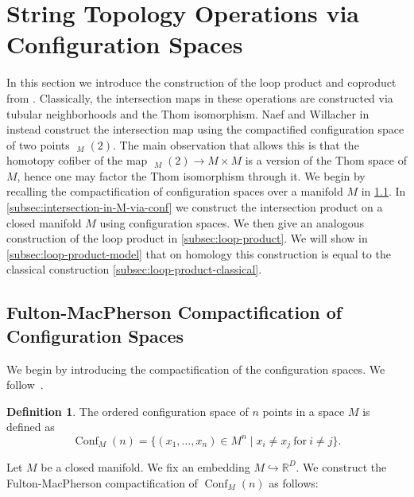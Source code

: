 \documentclass{scrartcl}
\theoremstyle{plain}
\theoremstyle{definition}
\newtheorem{definition}[theorem]{Definition}
\newcommand{\R}{\mathbb R}
\DeclareMathOperator{\Conf}{Conf}
\DeclareMathOperator{\cConf}{\overline{Conf}}
\begin{document}
\section{String Topology Operations via Configuration Spaces}\label{sec:string-ops-via-cfg-spaces}

In this section we introduce the construction of the loop product and coproduct from \cite{naef2019string}. Classically, the intersection maps in these operations are constructed via tubular neighborhoods and the Thom isomorphism. Naef and Willacher in \cite{naef2019string} instead construct the intersection map using the compactified configuration space of two points $\cConf_M(2)$. The main observation that allows this is that the homotopy cofiber of the map $\cConf_M(2)\to M\times M$ is a version of the Thom space of $M$, hence one may factor the Thom isomorphism through it. We begin by recalling the compactification of configuration spaces over a manifold $M$ in \cref{subsec:compactificatified-configuration-space}. In \cref{subsec:intersection-in-M-via-conf} we construct the intersection product on a closed manifold $M$ using configuration spaces. We then give an analogous construction of the loop product in \cref{subsec:loop-product}. We will show in \cref{subsec:loop-product-model} that on homology this construction is equal to the classical construction \ref{subsec:loop-product-classical}. 

\subsection{Fulton-MacPherson Compactification of Configuration Spaces}\label{subsec:compactificatified-configuration-space}

We begin by introducing the compactification of the configuration spaces. We follow~\cite{sinha2004manifold}.

\begin{definition}
The ordered configuration space of $n$ points in a space $M$ is defined as $$\Conf_M(n) = \{(x_1, \dots, x_n)\in M^n\mid x_i\neq x_j\ \text{for}\ i\neq j\}.$$ 
\end{definition}

Let $M$ be a closed manifold. We fix an embedding $M \hookrightarrow \R^D$. We construct the Fulton-MacPherson compactification of $\Conf_M(n)$ as follows:
\end{document}
